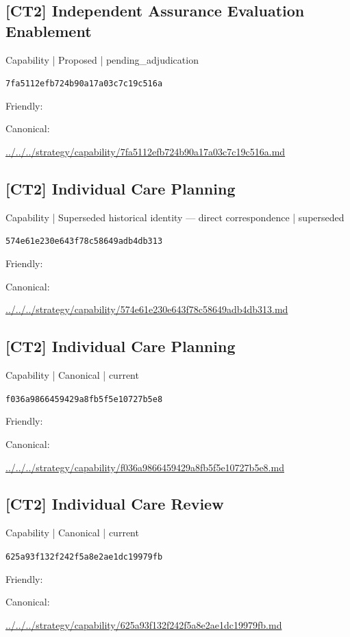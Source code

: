 \documentclass[10pt,a4paper]{article}
\begin{document}
\subsection*{[CT2] Independent Assurance Evaluation Enablement}
{\small Capability | Proposed | pending\_adjudication}\par
\texttt{7fa5112efb724b90a17a03c7c19c516a}\par
Friendly: \par
Canonical: \par
{\footnotesize\url{../../../strategy/capability/7fa5112efb724b90a17a03c7c19c516a.md}}\par
\subsection*{[CT2] Individual Care Planning}
{\small Capability | Superseded historical identity — direct correspondence | superseded}\par
\texttt{574e61e230e643f78c58649adb4db313}\par
Friendly: \par
Canonical: \par
{\footnotesize\url{../../../strategy/capability/574e61e230e643f78c58649adb4db313.md}}\par
\subsection*{[CT2] Individual Care Planning}
{\small Capability | Canonical | current}\par
\texttt{f036a9866459429a8fb5f5e10727b5e8}\par
Friendly: \par
Canonical: \par
{\footnotesize\url{../../../strategy/capability/f036a9866459429a8fb5f5e10727b5e8.md}}\par
\subsection*{[CT2] Individual Care Review}
{\small Capability | Canonical | current}\par
\texttt{625a93f132f242f5a8e2ae1dc19979fb}\par
Friendly: \par
Canonical: \par
{\footnotesize\url{../../../strategy/capability/625a93f132f242f5a8e2ae1dc19979fb.md}}\par
\end{document}
